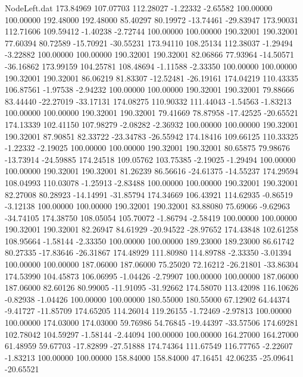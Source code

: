 \begin{filecontents}{NodeLeft.dat}
 173.84969  107.07703  112.28027    -1.22332   -2.65582  100.00000  100.00000  192.48000  192.48000   85.40297   80.19972  -13.74461  -29.83947
 173.90031  112.71606  109.59412    -1.40238   -2.72744  100.00000  100.00000  190.32001  190.32001   77.60394   80.72589  -15.70921  -30.55231
 173.94110  108.25134  112.38037    -1.29494   -3.22882  100.00000  100.00000  190.32001  190.32001   82.06866   77.93964  -14.50571  -36.16862
 173.99159  104.25781  108.48694    -1.11588   -2.33350  100.00000  100.00000  190.32001  190.32001   86.06219   81.83307  -12.52481  -26.19161
 174.04219  110.43335  106.87561    -1.97538   -2.94232  100.00000  100.00000  190.32001  190.32001   79.88666   83.44440  -22.27019  -33.17131
 174.08275  110.90332  111.44043    -1.54563   -1.83213  100.00000  100.00000  190.32001  190.32001   79.41669   78.87958  -17.42525  -20.65521
 174.13339  102.41150  107.98279    -2.08282   -2.36932  100.00000  100.00000  190.32001  190.32001   87.90851   82.33722  -23.34783  -26.55942
 174.18416  109.66125  110.33325    -1.22332   -2.19025  100.00000  100.00000  190.32001  190.32001   80.65875   79.98676  -13.73914  -24.59885
 174.24518  109.05762  103.75385    -2.19025   -1.29494  100.00000  100.00000  190.32001  190.32001   81.26239   86.56616  -24.61375  -14.55237
 174.29594  108.04993  110.03078    -1.25913   -2.83488  100.00000  100.00000  190.32001  190.32001   82.27008   80.28923  -14.14991  -31.85794
 174.34669  106.43921  114.62935    -0.86519   -3.12138  100.00000  100.00000  190.32001  190.32001   83.88080   75.69066   -9.62963  -34.74105
 174.38750  108.05054  105.70072    -1.86794   -2.58419  100.00000  100.00000  190.32001  190.32001   82.26947   84.61929  -20.94522  -28.97652
 174.43848  102.61258  108.95664    -1.58144   -2.33350  100.00000  100.00000  189.23000  189.23000   86.61742   80.27335  -17.83646  -26.31867
 174.48929  111.80980  114.89788    -2.33350   -3.01394  100.00000  100.00000  187.06000  187.06000   75.25020   72.16212  -26.21801  -33.86304
 174.53990  104.45873  106.06995    -1.04426   -2.79907  100.00000  100.00000  187.06000  187.06000   82.60126   80.99005  -11.91095  -31.92662
 174.58070  113.42098  116.10626    -0.82938   -1.04426  100.00000  100.00000  180.55000  180.55000   67.12902   64.44374   -9.41727  -11.85709
 174.65205  114.26014  119.26155    -1.72469   -2.97813  100.00000  100.00000  174.03000  174.03000   59.76986   54.76845  -19.44397  -33.57506
 174.69281  102.78042  104.59297    -1.58144   -2.44094  100.00000  100.00000  164.27000  164.27000   61.48959   59.67703  -17.82899  -27.51888
 174.74364  111.67549  116.77765    -2.22607   -1.83213  100.00000  100.00000  158.84000  158.84000   47.16451   42.06235  -25.09641  -20.65521

\end{filecontents}
